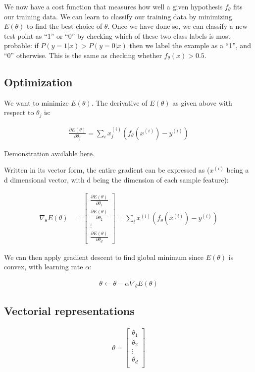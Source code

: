 We now have a cost function that measures how well a given hypothesis $f_\theta$ fits our training data. We can learn to classify our training data by minimizing $E(\theta)$ to find the best choice of $\theta$. Once we have done so, we can classify a new test point as “1” or “0” by checking which of these two class labels is most probable: if $P(y=1|x) > P(y=0|x)$ then we label the example as a “1”, and “0” otherwise. This is the same as checking whether $f_\theta(x) > 0.5$.

\subsection{Optimization}
We want to minimize $E(\theta)$. The derivative of $E(\theta)$ as given above with respect to $\theta_j$ is:

\begin{align}
	\frac{\partial E(\theta)}{\partial \theta_j} = \sum_i x^{(i)}_j (f_\theta(x^{(i)}) - y^{(i)})
\end{align}

Demonstration available \href{https://math.stackexchange.com/questions/477207/derivative-of-cost-function-for-logistic-regression}{here}.

Written in its vector form, the entire gradient can be expressed as ($x^{(i)}$ being a d dimensional vector, with d being the dimension of each sample feature):

\begin{align}
	\nabla_\theta E(\theta) 
	&= 
	\begin{bmatrix}
		\frac{\partial E(\theta)}{\partial \theta_1}\\
		\frac{\partial E(\theta)}{\partial \theta_2}\\
		\vdots\\
		\frac{\partial E(\theta)}{\partial \theta_d}
	\end{bmatrix}
	=
		\sum_i x^{(i)} (f_\theta(x^{(i)}) - y^{(i)})
\end{align}

We can then apply gradient descent to find global minimum since $E(\theta)$ is convex, with learning rate $\alpha$:

\begin{align}
	\theta \leftarrow \theta - \alpha \nabla_\theta E(\theta)
\end{align}

\subsection{Vectorial representations}
\begin{align}
	\theta = \left[
	\begin{array}{cccc}
		\theta_{1} \\
		\theta_{2} \\
		\vdots\\
		\theta_{d} \\
	\end{array}\right]
\end{align}

